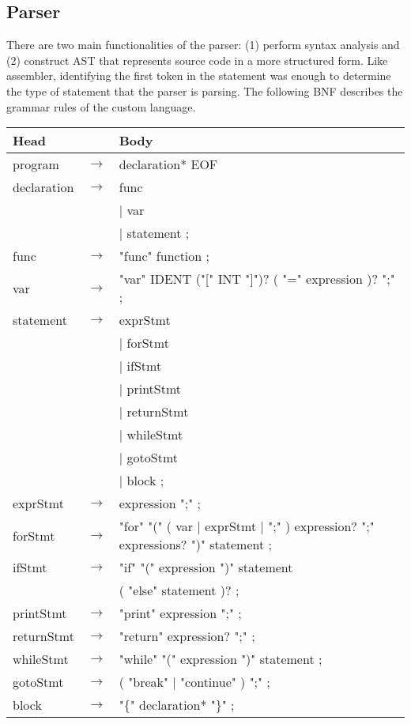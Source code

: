\documentclass[manuscript,screen,nonacm]{acmart}
\begin{document}
\subsection{Parser}
There are two main functionalities of the parser: (1) perform syntax analysis and (2) construct AST that represents source code in a more structured form. Like assembler, identifying the first token in the statement was enough to determine the type of statement that the parser is parsing. The following BNF describes the grammar rules of the custom language. 

\begin{center}
\begin{tabular}{l l l}
    \hline
    Head & & Body \\
    \hline
    program & $\rightarrow$ & declaration* EOF \\
    declaration & $\rightarrow$ & func \\
    ~ & ~ & | var \\
    ~ & ~ & | statement ; \\
    func & $\rightarrow$ & "func" function ; \\
    var & $\rightarrow$ & "var" IDENT ("[" INT "]")? ( "=" expression )? ";" ; \\
    statement & $\rightarrow$ & exprStmt \\
    ~ & ~ & | forStmt \\
    ~ & ~ & | ifStmt \\
    ~ & ~ & | printStmt \\
    ~ & ~ & | returnStmt \\
    ~ & ~ & | whileStmt \\
    ~ & ~ & | gotoStmt \\
    ~ & ~ & | block ; \\
    exprStmt & $\rightarrow$ & expression ";" ; \\
    forStmt & $\rightarrow$ & "for" "(" ( var | exprStmt | ";" ) expression? ";" expressions? ")" statement ; \\
    ifStmt & $\rightarrow$ & "if" "(" expression ")" statement \\
    ~ & ~ & ( "else" statement )? ; \\
    printStmt & $\rightarrow$ & "print" expression ";" ; \\
    returnStmt & $\rightarrow$ & "return" expression? ";" ; \\
    whileStmt & $\rightarrow$ & "while" "(" expression ")" statement ; \\
    gotoStmt & $\rightarrow$ & ( "break" | "continue" ) ";" ; \\
    block & $\rightarrow$ & "$\{$" declaration* "$\}$" ; \\
    \hline
\end{tabular}
\end{center}
\end{document}

